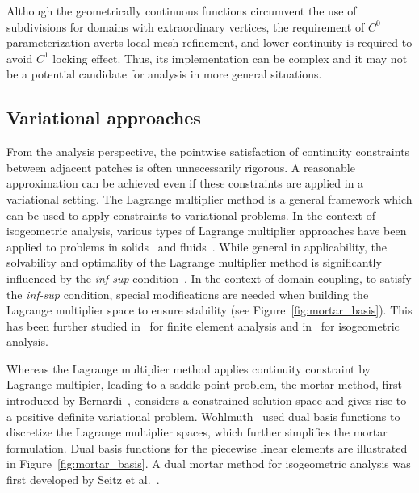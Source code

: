Although the geometrically continuous functions circumvent the use of subdivisions for domains with extraordinary vertices, the requirement of $C^0$ parameterization averts local mesh refinement, and lower continuity is required to avoid $C^1$ locking effect. Thus, its implementation can be complex and it may not be a potential candidate for analysis in more general situations.\par

\subsection{Variational approaches}

From the analysis perspective, the pointwise satisfaction of continuity constraints between adjacent patches is often unnecessarily rigorous. A reasonable approximation can be achieved even if these constraints are applied in a variational setting. The Lagrange multiplier method is a general framework which can be used to apply constraints to variational problems. In the context of isogeometric analysis, various types of Lagrange multiplier approaches have been applied to problems in solids~\cite{hesch_isogeometric_2012, seitz2016isogeometric} and fluids~\cite{bazilevs2012isogeometric}. While general in applicability, the solvability and optimality of the Lagrange multiplier method is significantly influenced by the \textit{inf-sup} condition~\cite{babuvska1973finite,boffi_mixed_2013}. In the context of domain coupling, to satisfy the \textit{inf-sup} condition, special modifications are needed when building the Lagrange multiplier space to ensure stability (see Figure~\ref{fig:mortar_basis}). This has been further studied in~\cite{bernardi_basics_2005, bernardi_domain_1993, belgacem_mortar_1998, barbosa1991finite} for finite element analysis and in~\cite{brivadis_isogeometric_2015} for isogeometric analysis. \par

Whereas the Lagrange multiplier method applies continuity constraint by Lagrange multipier, leading to a saddle point problem, the mortar method, first introduced by Bernardi~\cite{bernardi_domain_1993}, considers a constrained solution space and gives rise to a positive definite variational problem. Wohlmuth~\cite{wohlmuth2000mortar} used dual basis functions to discretize the Lagrange multiplier spaces, which further simplifies the mortar formulation. Dual basis functions for the piecewise linear elements are illustrated in Figure~\ref{fig:mortar_basis}. A dual mortar method for isogeometric analysis was first developed by Seitz et al.~\cite{seitz_isogeometric_2016}. \par

